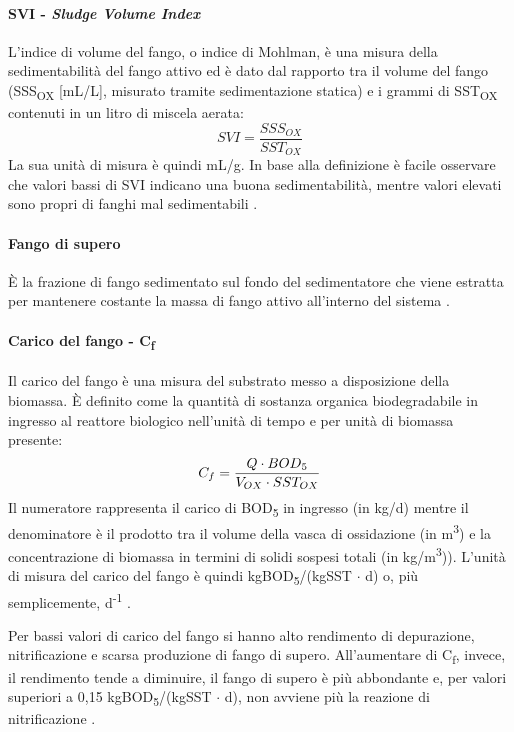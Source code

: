 \paragraph*{SVI - \textit{Sludge Volume Index}}
L'indice di volume del fango, o indice di Mohlman, è una misura della sedimentabilità del fango attivo ed è dato dal rapporto tra il volume del fango (SSS\textsubscript{OX} [mL/L], misurato tramite sedimentazione statica) e i grammi di SST\textsubscript{OX} contenuti in un litro di miscela aerata:
\begin{equation}
SVI=\frac{SSS_{OX}}{SST_{OX}}
\end{equation}
La sua unità di misura è quindi mL/g.
In base alla definizione è facile osservare che valori bassi di SVI indicano una buona sedimentabilità, mentre valori elevati sono propri di fanghi mal sedimentabili \cite{bonomo2008trattamenti}.
\paragraph*{Fango di supero} 
\`E la frazione di fango sedimentato sul fondo del sedimentatore che viene estratta per mantenere costante la massa di fango attivo all'interno del sistema \cite{collivignarelli2012ingegneria}.
\paragraph*{Carico del fango - C\textsubscript{f}}
Il carico del fango è una misura del substrato messo a disposizione della biomassa. \`E definito come la quantità di sostanza organica biodegradabile in ingresso al reattore biologico nell'unità di tempo e per unità di biomassa presente:
\begin{equation}
C_{f}=\frac{Q\cdot BOD\textsubscript{5}}{V_{OX}\cdot SST_{OX}}
\end{equation}
Il numeratore rappresenta il carico di BOD\textsubscript{5} in ingresso (in kg/d) mentre il denominatore è il prodotto tra il volume della vasca di ossidazione (in m\textsuperscript{3}) e la concentrazione di biomassa in termini di solidi sospesi totali (in kg/m\textsuperscript{3})). L'unità di misura del carico del fango è quindi kgBOD\textsubscript{5}/(kgSST $\cdot$ d) o, più semplicemente, d\textsuperscript{-1} \cite{bonomo2008trattamenti}.

Per bassi valori di carico del fango si hanno alto rendimento di depurazione, nitrificazione e scarsa produzione di fango di supero. All'aumentare di C\textsubscript{f}, invece, il rendimento tende a diminuire, il fango di supero è più abbondante e, per valori superiori a 0,15 kgBOD\textsubscript{5}/(kgSST $\cdot$ d), non avviene più la reazione di nitrificazione \cite{collivignarelli2012ingegneria}.

